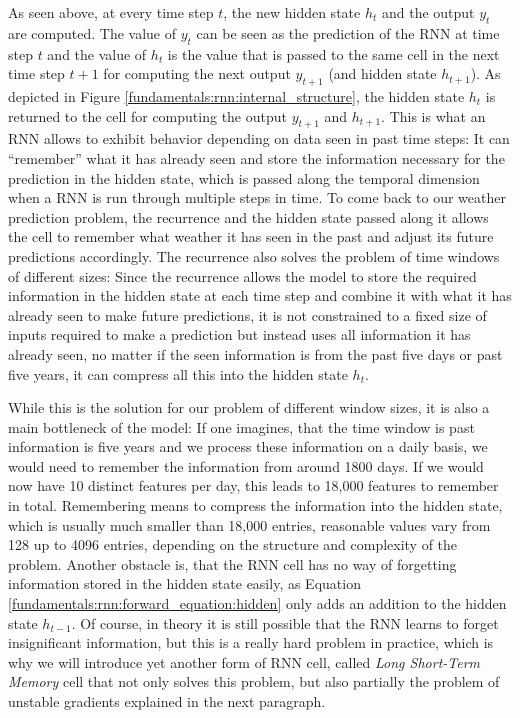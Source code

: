 As seen above, at every time step $t$, the new hidden state $h_t$ and the output $y_t$ are computed. The value of $y_t$ can be seen as the prediction of the RNN at time step $t$ and the value of $h_t$ is the value that is passed to the same cell in the next time step $t+1$ for computing the next output $y_{t+1}$ (and hidden state $h_{t+1}$). As depicted in Figure \ref{fundamentals:rnn:internal_structure}, the hidden state $h_t$ is returned to the cell for computing the output $y_{t+1}$ and $h_{t+1}$. This is what an RNN allows to exhibit behavior depending on data seen in past time steps: It can ``remember'' what it has already seen and store the information necessary for the prediction in the hidden state, which is passed along the temporal dimension when a RNN is run through multiple steps in time.
To come back to our weather prediction problem, the recurrence and the hidden state passed along it allows the cell to remember what weather it has seen in the past and adjust its future predictions accordingly. The recurrence also solves the problem of time windows of different sizes: Since the recurrence allows the model to store the required information in the hidden state at each time step and combine it with what it has already seen to make future predictions, it is not constrained to a fixed size of inputs required to make a prediction but instead uses all information it has already seen, no matter if the seen information is from the past five days or past five years, it can compress all this into the hidden state $h_t$.

While this is the solution for our problem of different window sizes, it is also a main bottleneck of the model: If one imagines, that the time window is past information is five years and we process these information on a daily basis, we would need to remember the information from around 1800 days. If we would now have 10 distinct features per day, this leads to 18,000 features to remember in total. Remembering means to compress the information into the hidden state, which is usually much smaller than 18,000 entries, reasonable values vary from 128 up to 4096 entries, depending on the structure and complexity of the problem. Another obstacle is, that the RNN cell has no way of forgetting information stored in the hidden state easily, as Equation \ref{fundamentals:rnn:forward_equation:hidden} only adds an addition to the hidden state $h_{t-1}$. Of course, in theory it is still possible that the RNN learns to forget insignificant information, but this is a really hard problem in practice, which is why we will introduce yet another form of RNN cell, called \emph{Long Short-Term Memory} cell that not only solves this problem, but also partially the problem of unstable gradients explained in the next paragraph.

